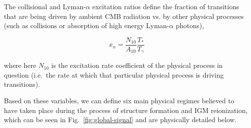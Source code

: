 The collisional and Lyman-$\alpha$ excitation ratios define the fraction of 
transitions that are being driven by ambient CMB radiation vs. by other 
physical processes (such as collisions or absorption of high energy 
Lyman-$\alpha$ photons),

\begin{equation}
    x_n = \frac{N_{10}}{A_{10}}\frac{T_*}{T_\gamma}
    \label{eq:excitation-ratio}
\end{equation}

where here $N_{10}$ is the excitation rate coefficient of the physical process 
in question (i.e.~the rate at which that particular physical process is driving 
transitions).

Based on these variables, we can define six main physical regimes believed to 
have taken place during the process of structure formation and IGM 
reionization, which can be seen in Fig.~\ref{fig:global-signal} and are 
physically detailed below.

